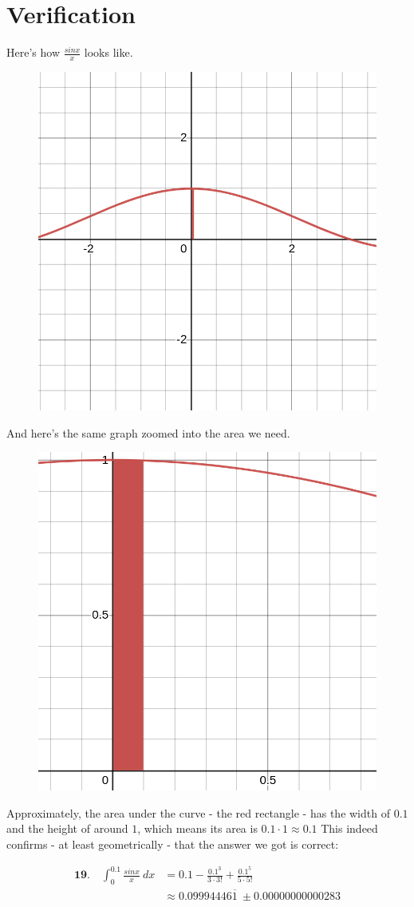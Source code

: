 \newpage

\section*{Verification}

Here's how $ \frac{sinx}{x} $
looks like.

\begin{figure}
	\centering
	\includegraphics[width=0.43\linewidth]{verification1}
	\caption{}
	\label{fig:verification1}
\end{figure}

And here's the same graph
zoomed into the area we need.

\begin{figure}
	\centering
	\includegraphics[width=0.43\linewidth]{verification2}
	\caption{}
	\label{fig:verification2}
\end{figure}

Approximately, the area under
the curve - the red rectangle -
has the width of
$ 0.1 $ and the height of 
around $ 1 $, which means its
area is $ 0.1 \cdot 1 \approx 0.1 $
This indeed confirms - at least
geometrically - that the answer we 
got is correct:

\begin{align}
	\textbf{19.}\quad \int_{0}^{0.1} 
	\frac{sinx}{x}\ dx
	&=
	0.1 
	-
	\frac{
		0.1^{3}
	}{
		3\cdot3!
	}
	+
	\frac{
		0.1^{5}
	}{
		5\cdot5!
	} \\
	&\approx
	0.09994446\overline{1}
	\ \pm  0.00000000000283
\end{align}


